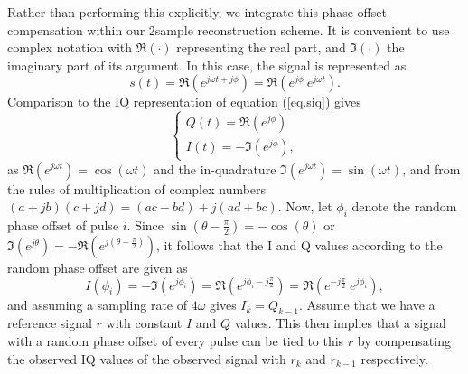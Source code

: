 \documentclass[12pt]{amsart}
\begin{document}
Rather than performing this explicitly, we integrate this phase offset compensation within our 2sample reconstruction scheme.
It is convenient to use complex notation with $\Re(\cdot)$ representing the real part, and $\Im(\cdot)$ the imaginary part of its argument. 
In this case, the signal is represented as 
\begin{equation}
	s(t) = \Re\left( e^{j \omega t + j\phi}\right) = \Re\left( e^{j\phi} \ e^{j \omega t}\right).
	\label{eq.csignal}
\end{equation}
Comparison to the IQ representation of equation (\ref{eq.siq}) gives 
\begin{equation}
	\begin{cases}
		 Q(t) = \Re\left( e^{j  \phi}\right) \\
		  I(t) = - \Im\left( e^{j  \phi}\right),
	\end{cases}
	\label{eq.csignal2iq}
\end{equation}
as $\Re\left( e^{j \omega t}\right) = \cos(\omega t)$ and the in-quadrature $\Im\left( e^{j \omega t}\right) = \sin(\omega t)$, and from the rules of multiplication of complex numbers 
$(a+jb)(c+jd)=(ac-bd) + j (ad+bc)$.
Now, let $\phi_i$ denote the random phase offset of pulse $i$.
Since $\sin\left(\theta-\frac{\pi}{2}\right)= - \cos(\theta)$
or $\Im(e^{j\theta}) = - \Re\left(e^{j\left(\theta-\frac{\pi}{2}\right)}\right)$, 
it follows that the I and Q values according to the random phase offset are given as
\begin{equation}
	I(\phi_i) 
	= - \Im\left( e^{j  \phi_i}\right) 
	= \Re\left( e^{j\phi_i - j\frac{\pi}{2}}\right) 
	= \Re\left( e^{ - j\frac{\pi}{2}} \ e^{j\phi_i}\right), 
	\label{eq.csignal.offset}
\end{equation}
and assuming a sampling rate of $4\omega$ gives $I_k = Q_{k-1}$.
Assume that we have a reference signal $r$ with constant $I$ and $Q$ values. 
This then implies that a signal with a random phase offset of every pulse 
can be tied to this $r$ by compensating the observed IQ values of the
observed signal with $r_k$ and $r_{k-1}$ respectively. 
\end{document}
